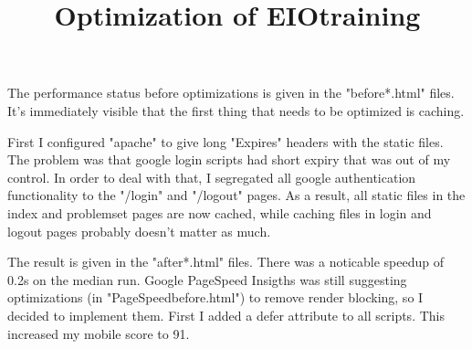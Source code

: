 \documentclass{article}
\begin{document}
\title{Optimization of EIOtraining}
\maketitle

The performance status before optimizations is given in the "before*.html" files. It's immediately visible that the first thing that needs to be optimized is caching.

First I configured "apache" to give long "Expires" headers with the static files. The problem was that google login scripts had short expiry that was out of my control. In order to deal with that, I segregated all google authentication functionality to the "/login" and "/logout" pages. As a result, all static files in the index and problemset pages are now cached, while caching files in login and logout pages probably doesn't matter as much.

The result is given in the "after*.html" files. There was a noticable speedup of 0.2s on the median run. Google PageSpeed Insigths was still suggesting optimizations (in "PageSpeedbefore.html") to remove render blocking, so I decided to implement them. First I added a defer attribute to all scripts. This increased my mobile score to 91.
\end{document}
